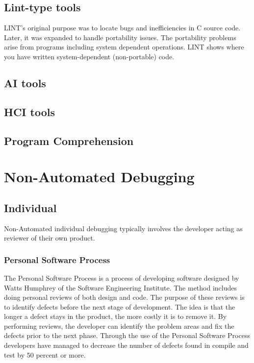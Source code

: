 \subsection{Lint-type tools}
LINT's original purpose was to locate bugs and inefficiencies in C source
code.  Later, it was expanded to handle portability issues.  The
portability problems arise from programs including system dependent
operations.  LINT shows where you have written system-dependent
(non-portable) code.

\subsection{AI tools}
\subsection{HCI tools}
\subsection{Program Comprehension}

\section{Non-Automated Debugging}
\subsection{Individual}
Non-Automated individual debugging typically involves the developer acting
as reviewer of their own product.

\subsubsection{Personal Software Process}
The Personal Software Process is a process of developing software designed
by Watts Humphrey of the Software Engineering Institute.  The method
includes doing personal reviews of both design and code.  The purpose of
these reviews is to identify defects before the next stage of development.
The idea is that the longer a defect stays in the product, the more costly
it is to remove it.  By performing reviews, the developer can identify the
problem areas and fix the defects prior to the next phase.  Through the use
of the Personal Software Process developers have managed to decrease the
number of defects found in compile and test by 50 percent or more.





